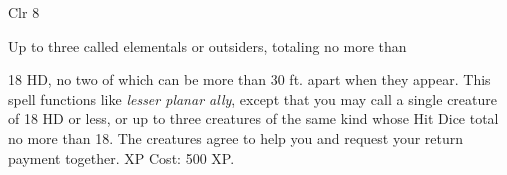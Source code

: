
\begin{description*}
\item[Level:] Clr 8
\item[Effect:] Up to three called elementals or outsiders, totaling no more than
\end{description*}

18 HD, no two of which can be more than 30 ft. apart when they appear.
This spell functions like \textit{lesser planar ally}, except that you may call
a single creature of 18 HD or less, or up to three creatures of the same kind whose
Hit Dice total no more than 18. The creatures agree to help you and request your
return payment together.
XP Cost: 500 XP.